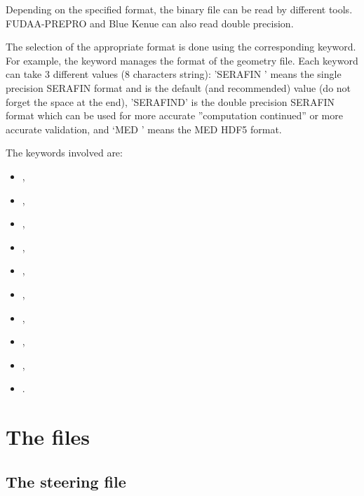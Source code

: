 Depending on the specified format, the binary file can be read by different
tools.
FUDAA-PREPRO and Blue Kenue can also read double precision.

The selection of the appropriate format is done using the corresponding keyword.
For example, the keyword  manages the format
of the geometry file.
Each keyword can take 3 different values (8 characters string): 'SERAFIN ' means
the single precision SERAFIN format and is the default (and recommended)
value (do not forget the space at the end),
'SERAFIND' is the double precision SERAFIN format which can be used
for more accurate ''computation continued'' or more accurate validation,
and `MED     ' means the MED HDF5 format.

The keywords involved are:

\begin{itemize}
\item {},

\item {},

\item {},

\item {},

\item {},

\item {},

\item {},

\item {},

\item {},

\item {}.
\end{itemize}


\section{The files}


\subsection{The steering file}

